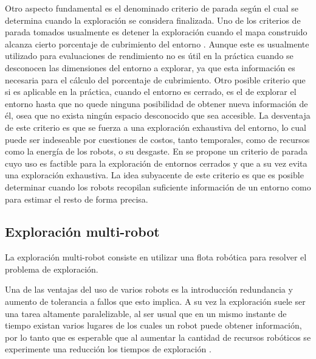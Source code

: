 
Otro aspecto fundamental es el denominado criterio de parada según el cual se
determina cuando la exploración se considera finalizada. Uno de los criterios
de parada tomados usualmente es detener la exploración cuando el mapa
construido alcanza cierto porcentaje de cubrimiento del entorno
\cite{Yan2015}. Aunque este es usualmente utilizado para evaluaciones de
rendimiento no es útil en la práctica cuando se desconocen las dimensiones del
entorno a explorar, ya que esta información es necesaria para el cálculo del
porcentaje de cubrimiento.
Otro posible criterio que si es aplicable en la práctica, cuando el entorno es
cerrado, es el de explorar el entorno hasta que no quede ninguna posibilidad de
obtener nueva información de él, osea que no exista ningún espacio desconocido
que sea accesible. La desventaja de este criterio es que se fuerza a una
exploración exhaustiva del entorno, lo cual puede ser indeseable por cuestiones
de costos, tanto temporales, como de recursos como la energía de los robots, o
su desgaste. En \cite{Amorin2019} se propone un criterio de parada cuyo
uso es factible para la exploración de entornos cerrados y que a
su vez evita una exploración exhaustiva. La idea subyacente de este criterio es
que es posible determinar cuando los robots recopilan suficiente información de
un entorno como para estimar el resto de forma precisa.



\subsection{Exploración multi-robot}\label{subsec:expmutirob}
La exploración multi-robot consiste en utilizar una flota robótica para resolver
el problema de exploración.

Una de las ventajas del uso de varios robots es la introducción redundancia y
aumento de tolerancia a fallos que esto implica. A su vez la exploración suele
ser una tarea altamente paralelizable, al ser usual que en un mismo instante de
tiempo existan varios lugares de los cuales un robot puede obtener información,
por lo tanto que es esperable que al aumentar la cantidad de recursos robóticos
se experimente una reducción los tiempos de exploración
\cite{cao1997cooperative,dudek1996taxonomy,guzzoni1997many}. 

